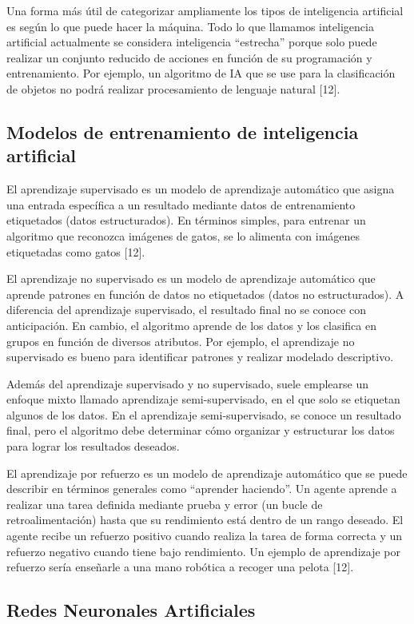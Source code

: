 Una forma más útil de categorizar ampliamente los tipos de inteligencia artificial es según lo que puede hacer la máquina. Todo lo que llamamos inteligencia artificial actualmente se considera inteligencia “estrecha” porque solo puede realizar un conjunto reducido de acciones en función de su programación y entrenamiento. Por ejemplo, un algoritmo de IA que se use para la clasificación de objetos no podrá realizar procesamiento de lenguaje natural [12].

\subsection{Modelos de entrenamiento de inteligencia artificial}

El aprendizaje supervisado es un modelo de aprendizaje automático que asigna una entrada específica a un resultado mediante datos de entrenamiento etiquetados (datos estructurados). En términos simples, para entrenar un algoritmo que reconozca imágenes de gatos, se lo alimenta con imágenes etiquetadas como gatos [12].

El aprendizaje no supervisado es un modelo de aprendizaje automático que aprende patrones en función de datos no etiquetados (datos no estructurados). A diferencia del aprendizaje supervisado, el resultado final no se conoce con anticipación. En cambio, el algoritmo aprende de los datos y los clasifica en grupos en función de diversos atributos. Por ejemplo, el aprendizaje no supervisado es bueno para identificar patrones y realizar modelado descriptivo.

Además del aprendizaje supervisado y no supervisado, suele emplearse un enfoque mixto llamado aprendizaje semi-supervisado, en el que solo se etiquetan algunos de los datos. En el aprendizaje semi-supervisado, se conoce un resultado final, pero el algoritmo debe determinar cómo organizar y estructurar los datos para lograr los resultados deseados.

El aprendizaje por refuerzo es un modelo de aprendizaje automático que se puede describir en términos generales como “aprender haciendo”. Un agente aprende a realizar una tarea definida mediante prueba y error (un bucle de retroalimentación) hasta que su rendimiento está dentro de un rango deseado. El agente recibe un refuerzo positivo cuando realiza la tarea de forma correcta y un refuerzo negativo cuando tiene bajo rendimiento. Un ejemplo de aprendizaje por refuerzo sería enseñarle a una mano robótica a recoger una pelota [12].


\subsection{Redes Neuronales Artificiales}

